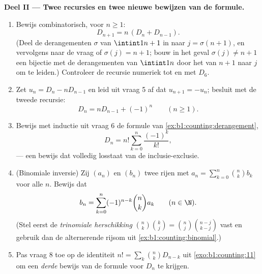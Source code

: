 \begin{problem}
\medskip
\noindent\textbf{Deel II --- Twee recursies en twee nieuwe bewijzen van
de formule.}
\begin{enumerate}[resume]
  \item Bewijs combinatorisch, voor $n \geq 1$:
        \[
        D_{n+1} = n\,(D_n + D_{n-1}) .
        \]
        (Deel de derangementen $\sigma$ van $\intint1{n+1}$ in naar $j =
        \sigma(n+1)$, en vervolgens naar de vraag of $\sigma(j) = n +
        1$; bouw in het geval $\sigma(j) \neq n+1$ een bijectie met de
        derangementen van $\intint1n$ door het  van $n + 1$
        naar $j$ om te leiden.) Controleer de recursie numeriek tot en
        met $D_6$.
  \item Zet $u_n = D_n - n D_{n-1}$ en leid uit vraag 5 af dat $u_{n+1}
        = -u_n$; besluit met de tweede recursie:
        \[
        D_n = n D_{n-1} + (-1)^n \qquad (n \geq 1).
        \]
  \item Bewijs met inductie uit vraag 6 de formule van
        \cref{ex:b1:counting:derangement},
        \[
        D_n = n! \sum_{k=0}^{n} \frac{(-1)^k}{k!},
        \]
        --- een bewijs dat volledig losstaat van de inclusie-exclusie.
  \item (Binomiale inversie) Zij $(a_n)$ en $(b_n)$ twee rijen met $a_n
        = \sum_{k=0}^n \binom nk b_k$ voor alle $n$. Bewijs dat
        \[
        b_n = \sum_{k=0}^{n} (-1)^{n-k} \binom nk a_k
        \qquad (n \in \N).
        \]
        (Stel eerst de \emph{trinomiale herschikking} $\binom nk \binom
        kj = \binom nj \binom{n-j}{k-j}$ vast en gebruik dan de
        alternerende rijsom uit \cref{ex:b1:counting:binomial}.)
  \item Pas vraag 8 toe op de identiteit $n! = \sum_k \binom nk D_{n-k}$
        uit \cref{exo:b1:counting:11} om een \emph{derde} bewijs van de
        formule voor $D_n$ te krijgen.
\end{enumerate}


\end{problem}
